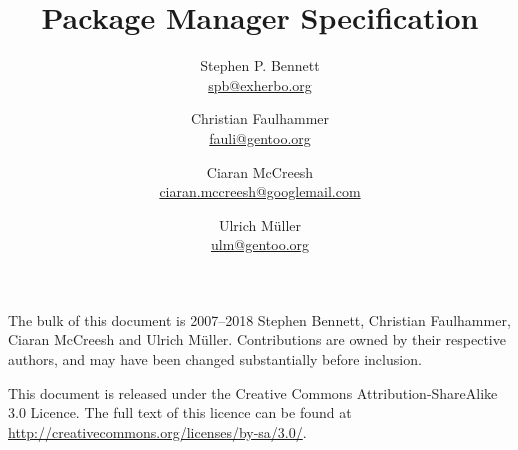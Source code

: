 \documentclass{pms}
\title{Package Manager Specification}
\author{%
    Stephen P. Bennett \\
    \href{mailto:spb@exherbo.org}{spb@exherbo.org}
    \and
    Christian Faulhammer \\
    \href{mailto:fauli@gentoo.org}{fauli@gentoo.org}
    \and
    Ciaran McCreesh \\
    \href{mailto:ciaran.mccreesh@googlemail.com}{ciaran.mccreesh@googlemail.com}
    \and
    Ulrich Müller \\
    \href{mailto:ulm@gentoo.org}{ulm@gentoo.org}
}
\begin{document}
\maketitle

\thispagestyle{empty}
\vspace*{\fill}
{%
    \small
    The bulk of this document is \textcopyright{} 2007--2018 Stephen Bennett, Christian Faulhammer,
    Ciaran McCreesh and Ulrich Müller. Contributions are owned by their respective authors, and may
    have been changed substantially before inclusion.

    This document is released under the Creative Commons Attribution-ShareAlike 3.0 Licence. The
    full text of this licence can be found at \url{http://creativecommons.org/licenses/by-sa/3.0/}.

    \commitinfo
}

\tableofcontents
\listofalgorithms
\listoflistings
\listoftables

































\appendix
\setcounter{secnumdepth}{0}





\end{document}
